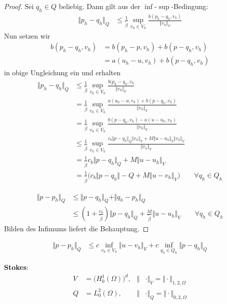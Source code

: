 \begin{proof}
	Sei $q_h\in Q$ beliebig. Dann gilt aus der $\inf$-$\sup$-Bedingung:
	\begin{align*}
		\Vert p_h-q_h\Vert_Q
		&\leq\frac{1}{\tilde{\beta}}\sup\limits_{v_h\in V_h}\frac{b(p_h-q_h,v_h)}{\Vert v_h\Vert_V}
	\end{align*}
	Nun setzen wir
	\begin{align*}
		b(p_h-q_h,v_h)
		&=b(p_h-p,v_h)+b(p-q_h,v_h)\\
		&=a(u_h-u,v_h)+b(p-q_h,v_h)
	\end{align*}
	in obige Ungleichung ein und erhalten
	\begin{align*}
		\Vert p_h-q_h\Vert_Q
		&\leq\frac{1}{\tilde{\beta}}\sup\limits_{v_h\in V_h}\frac{b(p_h-q_h,v_h}{\Vert v_h\Vert_V}\\
		&=\frac{1}{\tilde{\beta}}\sup\limits_{v_h\in V_h}\frac{a(u_h-u,v_h)+b(p-q_h,v_h)}{\Vert v_h\Vert_V}\\
		&=\frac{1}{\tilde{\beta}}\sup\limits_{v_h\in V_h}\frac{b(p-q_h,v_h)-a(u-u_h,v_h)}{\Vert v_h\Vert_V}\\
		&\leq\frac{1}{\tilde{\beta}}\sup\limits_{v_h\in V_h}\frac{c_b\Vert p-q_h\Vert_Q\Vert v_h\Vert_V+M\Vert u-u_h\Vert_V\Vert v_h\Vert_V}{\Vert v_h\Vert_V}\\
		&=\frac{1}{\tilde{\beta}}c_b\Vert p-q_h\Vert_Q+M\Vert u-u_h\Vert_V\\
		&=\frac{1}{\tilde{\beta}}\Big(c_b\Vert p-q_h\Vert-Q+M\Vert u-v_h\Vert_V\Big)\qquad\forall q_h\in Q_h
	\end{align*}

	\begin{align*}
		\Vert p-p_h\Vert_Q
		&\leq\Vert p-q_h\Vert_Q+\Vert q_h-p_h\Vert_Q\\
		&\leq \left(1+\frac{c_b}{\tilde{\beta}}\right)\Vert p-q_h\Vert_Q+\frac{M}{\tilde{\beta}}\Vert u-u_h\Vert_V\qquad\forall q_h\in Q_h
	\end{align*}
	Bilden des Infimums liefert die Behauptung.
\end{proof}

\begin{bemerkung}
	\begin{align*}
		\Vert p-p_h\Vert_Q
		&\leq c\inf\limits_{v_h\in V_h}\Vert u-v_h\Vert_V+c\inf\limits_{q_h\in Q_h}\Vert p-q_h\Vert_Q
	\end{align*}
\end{bemerkung}

\textbf{Stokes}:
\begin{align*}
	V&=\big(H_0^1(\Omega)\big)^d, &\Vert&\cdot\Vert_V=\Vert\cdot\Vert_{1,2,\Omega}\\
	Q&=L_0^2(\Omega), &\Vert&\cdot\Vert_Q=\Vert\cdot\Vert_{0,2,\Omega}
\end{align*}

